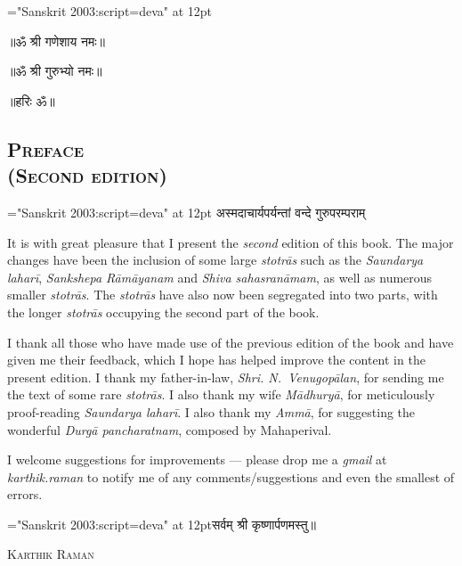 {\font \x="Sanskrit 2003:script=deva" at 12pt\x
\centerline{॥ॐ श्री गणेशाय नमः॥}
\centerline{॥ॐ श्री गुरुभ्यो नमः॥}
\centerline{॥हरिः ॐ॥}
}
\thispagestyle{fancyplain}

\begin{center}
\chapter*{\texorpdfstring{\scshape{Preface\\(Second edition)}}{Preface\\(Second edition)}}
\end{center}

{\font \x="Sanskrit 2003:script=deva" at 12pt\x
{}
{अस्मदाचार्यपर्यन्तां वन्दे गुरुपरम्पराम्}
}

It is with great pleasure that I present the \emph{second} edition of this book. The major changes  have been the inclusion of some large \emph{stotrās} such as the \emph{Saundarya laharī}, \emph{Sankshepa Rāmāyanam} and \emph{Shiva sahasranāmam}, as well as numerous smaller \emph{stotrās}. The \emph{stotrās} have also now been segregated into two parts, with the longer \emph{stotrās} occupying the second part of the book.

I thank all those who have made use of the previous edition of the book and have given me their feedback, which I hope has helped improve the content in the present edition. I thank my father-in-law, \textit{Shri. N.~Venugopālan}, for sending me the text of some rare \emph{stotrās}. I also thank my wife \textit{Mādhuryā}, for meticulously proof-reading \emph{Saundarya laharī}. I also thank my \textit{Ammā}, for suggesting the wonderful \textit{Durgā pancharatnam}, composed by Mahaperival.

I welcome suggestions for improvements --- please drop me a \textit{gmail} at \textit{karthik.raman} to notify me of any comments/suggestions and even the smallest of errors.

\centerline{\font \x="Sanskrit 2003:script=deva" at 12pt\x सर्वम् श्री कृष्णार्पणमस्तु॥}

\medskip
{} \hfill \textsc{Karthik Raman}
